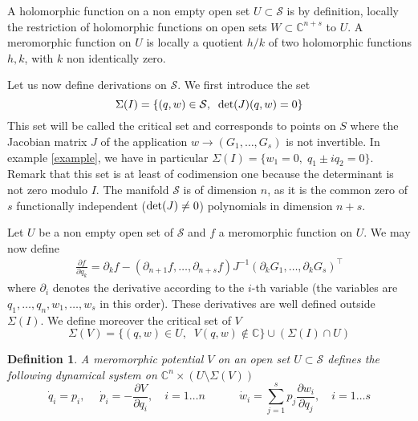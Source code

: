 \documentclass[smallcondensed]{svjour3}
\newtheorem{defi}{Definition}
\begin{document}
\bigskip

A holomorphic function on a non empty open set $U\subset \mathcal{S}$ is by definition, locally the restriction of holomorphic functions on open sets $W\subset \mathbb{C}^{n+s}$ to $U$. A meromorphic function on $U$ is locally a quotient $h/k$ of two holomorphic functions $h,k$, with $k$ non identically zero.


Let us now define derivations on $\mathcal{S}$. We first introduce the set
$$\Sigma(I)=\{(q,w)\in\mathcal{S},\;\; \hbox{det}(J)(q,w)=0\}$$
This set will be called the critical set and corresponds to points on $S$ where the Jacobian matrix $J$ of the application $w\longrightarrow (G_1,\dots,G_s)$ is not invertible. In example \eqref{example}, we have in particular $\Sigma(I)=\{w_1=0,\;q_1\pm i q_2=0\}$. Remark that this set is at least of codimension one because the determinant is not zero modulo $I$. The manifold $\mathcal{S}$ is of dimension $n$, as it is the common zero of $s$ functionally independent ($\hbox{det}(J)\neq 0$) polynomials in dimension $n+s$.

Let $U$ be a non empty open set of $\mathcal{S}$ and $f$ a meromorphic function on $U$. We may now define
\begin{align}\label{deriv}
\frac{\partial f}{\partial q_k}= \partial_k f-
\left( \partial_{n+1} f,\dots,\partial_{n+s} f\right)J^{-1} \left(\partial_k G_1,\dots,\partial_k G_s\right)^\intercal
\end{align}
where $\partial_i$ denotes the derivative according to the $i$-th variable (the variables are $q_1,\dots,q_n,w_1,\dots,w_s$ in this order). These derivatives are well defined outside $\Sigma(I)$. We define moreover the critical set of $V$
$$\Sigma(V)=\{(q,w)\in U,\;\; V(q,w)\notin \mathbb{C} \} \cup (\Sigma(I)\cap U)$$


\begin{defi}
A meromorphic potential $V$ on an open set $U\subset \mathcal{S}$ defines the following dynamical system on $\mathbb{C}^n\times \left(U \setminus \Sigma(V)\right)$
\begin{equation}\label{eqpot}
\dot{q}_i=p_i,\quad\; \dot{p}_i=-\frac{\partial V}{\partial q_i},\quad i=1\dots n\qquad\quad  \dot{w}_i=\sum\limits_{j=1}^s p_j \frac{\partial w_i}{\partial q_j},\quad i=1\dots s
\end{equation}
\end{defi}
\end{document}
